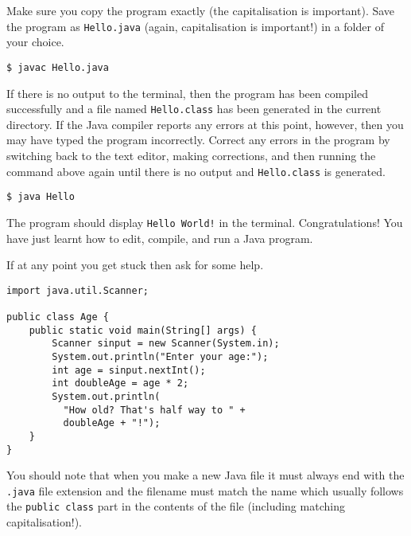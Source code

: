 Make sure you copy the program exactly (the capitalisation is important). Save the program as \texttt{Hello.java} (again, capitalisation is important!) in a folder of your choice.

\taskLine


\begin{verbatim}
$ javac Hello.java
\end{verbatim}

If there is no output to the terminal, then the program has been compiled successfully and a file named \texttt{Hello.class} has been generated in the current directory. If the Java compiler reports any errors at this point, however, then you may have typed the program incorrectly. Correct any errors in the program by switching back to the text editor, making corrections, and then running the command above again until there is no output and \texttt{Hello.class} is generated.

\taskLine


\begin{verbatim}
$ java Hello
\end{verbatim}

The program should display {\tt Hello World!} in the terminal. Congratulations! You have just learnt how to edit, compile, and run a Java program.

\taskLine


If at any point you get stuck then ask for some help.

\taskLine 


\begin{verbatim}
import java.util.Scanner;

public class Age { 
    public static void main(String[] args) {
        Scanner sinput = new Scanner(System.in);
        System.out.println("Enter your age:");
        int age = sinput.nextInt();
        int doubleAge = age * 2;
        System.out.println(
          "How old? That's half way to " + 
          doubleAge + "!");
    }
}
\end{verbatim}
You should note that when you make a new Java file it must
always end with the \texttt{.java} file extension and the filename must match the name which usually follows the \texttt{public 
class} part in the contents of the file (including matching capitalisation!). 

